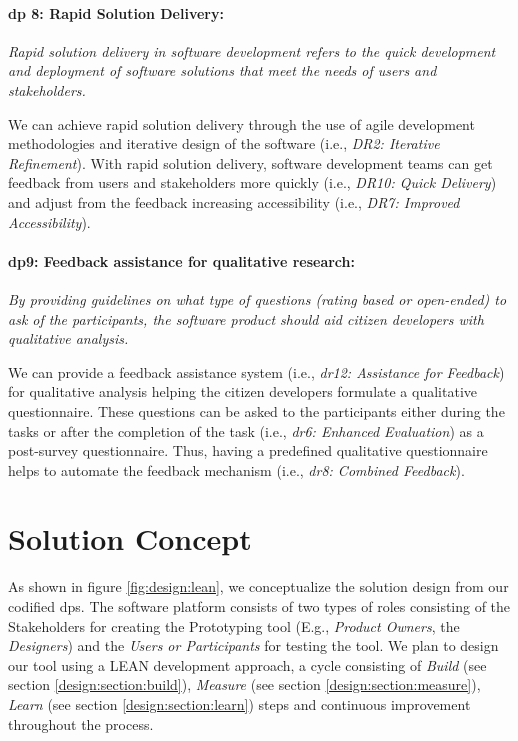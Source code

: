 \paragraph{\ac{dp} 8: Rapid Solution Delivery:} \textit{Rapid solution delivery in software development refers to the quick development and deployment of software solutions that meet the needs of users and stakeholders.}

We can achieve rapid solution delivery through the use of agile development methodologies and iterative design of the software (i.e., \textit{DR2: Iterative Refinement}).
With rapid solution delivery, software development teams can get feedback from users and stakeholders more quickly (i.e., \textit{DR10: Quick Delivery}) and adjust from the feedback increasing accessibility (i.e., \textit{DR7: Improved Accessibility}).

\paragraph{\ac{dp}9: Feedback assistance for qualitative research:} \textit{By providing guidelines on what type of questions (rating based or open-ended) to ask of the participants, the software product should aid citizen developers with qualitative analysis.}

We can provide a feedback assistance system (i.e., \textit{\ac{dr}12: Assistance for Feedback}) for qualitative analysis helping the citizen developers formulate a qualitative questionnaire. 
These questions can be asked to the participants either during the tasks or after the completion of the task (i.e., \textit{\ac{dr}6: Enhanced Evaluation}) as a post-survey questionnaire. 
Thus, having a predefined qualitative questionnaire helps to automate the feedback mechanism (i.e., \textit{\ac{dr}8: Combined Feedback}).

\clearpage
\section{Solution Concept}
\label{design:section:solutionconcept}
As shown in figure \ref{fig:design:lean}, we conceptualize the solution design from our codified \ac{dp}s.
The software platform consists of two types of roles consisting of the Stakeholders for creating the Prototyping tool (E.g., \textit{Product Owners}, the \textit{Designers}) and the \textit{Users or Participants} for testing the tool.
We plan to design our tool using a LEAN development approach, a cycle consisting of \textit{Build} (see section \ref{design:section:build}), \textit{Measure} (see section \ref{design:section:measure}), \textit{Learn} (see section \ref{design:section:learn}) steps and continuous improvement throughout the process.

